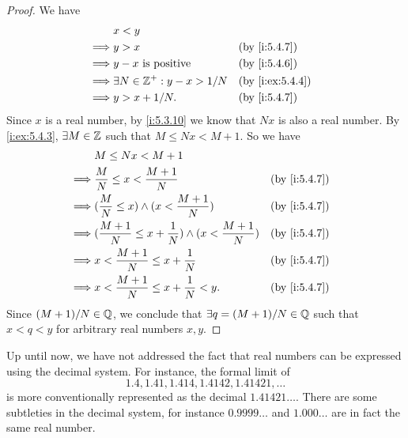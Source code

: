 \begin{proof}
  We have
  \begin{align*}
             & x < y                                                   \\
    \implies & y > x                              &  & \by{i:5.4.7}    \\
    \implies & y - x \text{ is positive}          &  & \by{i:5.4.6}    \\
    \implies & \exists N \in \Z^+ : y - x > 1 / N &  & \by{i:ex:5.4.4} \\
    \implies & y > x + 1 / N.                     &  & \by{i:5.4.7}    \\
  \end{align*}
  Since \(x\) is a real number, by \cref{i:5.3.10} we know that \(Nx\) is also a real number.
  By \cref{i:ex:5.4.3}, \(\exists M \in \mathbb{Z}\) such that \(M \leq Nx < M + 1\).
  So we have
  \begin{align*}
             & M \leq Nx < M + 1                                                                       \\
    \implies & \dfrac{M}{N} \leq x < \dfrac{M + 1}{N}                                &  & \by{i:5.4.7} \\
    \implies & (\dfrac{M}{N} \leq x) \land (x < \dfrac{M + 1}{N})                    &  & \by{i:5.4.7} \\
    \implies & (\dfrac{M + 1}{N} \leq x + \dfrac{1}{N}) \land (x < \dfrac{M + 1}{N}) &  & \by{i:5.4.7} \\
    \implies & x < \dfrac{M + 1}{N} \leq x + \dfrac{1}{N}                            &  & \by{i:5.4.7} \\
    \implies & x < \dfrac{M + 1}{N} \leq x + \dfrac{1}{N} < y.                       &  & \by{i:5.4.7}
  \end{align*}
  Since \((M + 1) / N \in \mathbb{Q}\), we conclude that \(\exists q = (M + 1) / N \in \mathbb{Q}\) such that \(x < q < y\) for arbitrary real numbers \(x, y\).
\end{proof}

\begin{rmk}\label{i:5.4.15}
  Up until now, we have not addressed the fact that real numbers can be expressed using the decimal system.
  For instance, the formal limit of
  \[
    1.4, 1.41, 1.414, 1.4142, 1.41421, \dots
  \]
  is more conventionally represented as the decimal \(1.41421\dots\).
  There are some subtleties in the decimal system, for instance \(0.9999\dots\) and \(1.000\dots\) are in fact the same real number.
\end{rmk}

